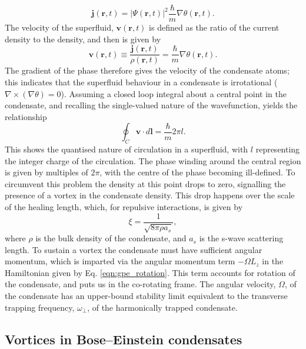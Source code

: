 \begin{equation}
\textbf{j}(\textbf{r},t) = \vert\Psi(\textbf{r},t)\vert ^2\frac{\hbar}{m}\nabla\theta(\textbf{r},t).
\end{equation}
The velocity of the superfluid, $\textbf{v}(\textbf{r},t)$ is defined as the ratio of the current density to the density, and then is given by
\begin{equation}\label{eqn:velocity}
\textbf{v}(\textbf{r},t)\equiv \frac{\textbf{j}(\textbf{r},t)}{\rho(\textbf{r},t)} = \frac{\hbar}{m}\nabla\theta(\textbf{r},t).
\end{equation}
The gradient of the phase therefore gives the velocity of the condensate atoms; this indicates that the superfluid behaviour in a condensate is irrotational ($\nabla\times(\nabla\theta) =0$). Assuming a closed loop integral about a central point in the condensate, and recalling the single-valued nature of the wavefunction, yields the relationship
\begin{equation}\label{eqn:circulation}
\oint_C \textbf{v}\cdot d\textbf{l} = \frac{\hbar}{m}2\pi l.
\end{equation}
This shows the quantised nature of circulation in a superfluid, with $l$ representing the integer charge of the circulation. The phase winding around the central region is given by multiples of $2\pi$, with the centre of the phase becoming ill-defined. To circumvent this problem the density at this point drops to zero, signalling the presence of a vortex in the condensate density. This drop happens over the scale of the healing length, which, for repulsive interactions, is given by
\begin{equation}
\xi = \frac{1}{\sqrt{8\pi \rho a_s}},
\end{equation}
where $\rho$ is the bulk density of the condensate, and $a_s$ is the s-wave scattering length. To sustain a vortex the condensate must have sufficient angular momentum, which is imparted via the angular momentum term $-\Omega L_z$ in the Hamiltonian given by Eq. \eqref{eqn:gpe_rotation}. This term accounts for rotation of the condensate, and puts us in the co-rotating frame. The angular velocity, $\Omega$, of the condensate has an upper-bound stability limit equivalent to the transverse trapping frequency, $\omega_{\perp}$, of the harmonically trapped condensate.


\subsection{Vortices in Bose--Einstein condensates}\label{ss:vorticesinbec}
















